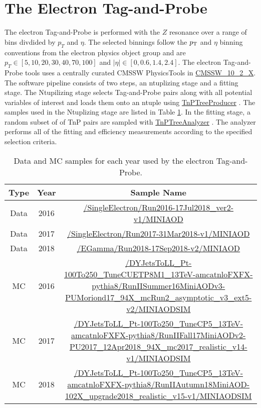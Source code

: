 \section{The Electron Tag-and-Probe }

The electron Tag-and-Probe is performed with the $Z$ resonance over a range of bins divdided by $p_T$ and $\eta$. The selected binnings follow the $p_{\mathrm{T}}$ and $\eta$ binning conventions from the electron physics object group and are $ p_T \in [5, 10, 20, 30, 40, 70, 100]$ and $|\eta| \in [ 0, 0.6, 1.4, 2.4]$. The electron Tag-and-Probe tools uses a centrally curated CMSSW PhysicsTools in \url{CMSSW_10_2_X}. The software pipeline consists of two steps, an ntuplizing stage and a fitting stage. The  Ntupilizing stage selects Tag-and-Probe pairs along with all potential variables of interest and loads them onto an ntuple using \url{TnPTreeProducer} \cite{ElTnPGit}. The samples used in the Ntuplizing stage are listed in Table \ref{tab:electronTnPSamples}. In the fitting stage, a random subset of of TnP pairs are sampled with \url{TnPTreeAnalyzer} \cite{ElTnPAnaGit}. The analyzer performs all of the fitting and efficiency measurements according to the specified selection criteria. 

\begin{table}
\caption{ Data and MC samples for each year used by the electron Tag-and-Probe. }
\label{tab:electronTnPSamples}
\scriptsize
\begin{adjustwidth}{-0.5in}{-1in}
\begin{tabular}{cc|c}
\hline
Type & Year & Sample Name \\ 
\hline
\hline 
Data & 2016 & \tiny \url{/SingleElectron/Run2016-17Jul2018_ver2-v1/MINIAOD}  \\  
Data & 2017 & \tiny \url{/SingleElectron/Run2017-31Mar2018-v1/MINIAOD} \\  
Data & 2018 & \tiny \url{/EGamma/Run2018-17Sep2018-v2/MINIAOD} \\ 
\hline 
MC & 2016 & \tiny \url{/DYJetsToLL_Pt-100To250_TuneCUETP8M1_13TeV-amcatnloFXFX-pythia8/RunIISummer16MiniAODv3-PUMoriond17_94X_mcRun2_asymptotic_v3_ext5-v2/MINIAODSIM} \\ 
MC & 2017 & \tiny \url{/DYJetsToLL_Pt-100To250_TuneCP5_13TeV-amcatnloFXFX-pythia8/RunIIFall17MiniAODv2-PU2017_12Apr2018_94X_mc2017_realistic_v14-v1/MINIAODSIM} \\ 
MC & 2018 & \tiny \url{/DYJetsToLL_Pt-100To250_TuneCP5_13TeV-amcatnloFXFX-pythia8/RunIIAutumn18MiniAOD-102X_upgrade2018_realistic_v15-v1/MINIAODSIM} \\ 
\hline
\end{tabular} 
\end{adjustwidth}
\end{table}




